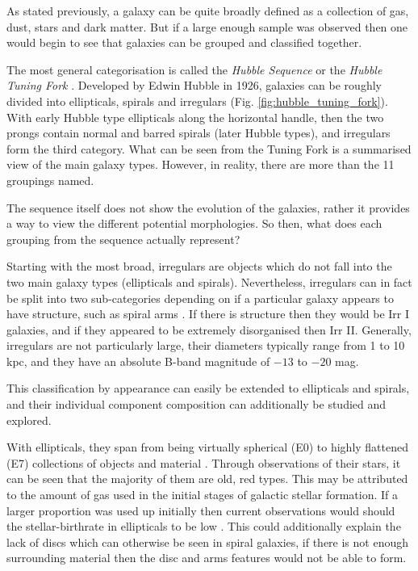 \documentclass[12pt, twocolumn]{revtex4-1}    %
\begin{document}
As stated previously, a galaxy can be quite broadly defined as a collection of gas, dust, stars and dark matter. But if a large enough sample was observed then one would begin to see that galaxies can be grouped and classified together.

The most general categorisation is called the \textit{Hubble Sequence} or the \textit{Hubble Tuning Fork} \citep{carroll_astro}. Developed by Edwin Hubble in 1926, galaxies can be roughly divided into ellipticals, spirals and irregulars (Fig. \ref{fig:hubble_tuning_fork}). With early Hubble type ellipticals along the horizontal handle, then the two prongs contain normal and barred spirals (later Hubble types), and irregulars form the third category. What can be seen from the Tuning Fork is a summarised view of the main galaxy types. However, in reality, there are more than the 11 groupings named.

The sequence itself does not show the evolution of the galaxies, rather it provides a way to view the different potential morphologies. So then, what does each grouping from the sequence actually represent? 

Starting with the most broad, irregulars are objects which do not fall into the two main galaxy types (ellipticals and spirals). Nevertheless, irregulars can in fact be split into two sub-categories depending on if a particular galaxy appears to have structure, such as spiral arms \citep{carroll_astro}. If there is structure then they would be Irr I galaxies, and if they appeared to be extremely disorganised then Irr II. Generally, irregulars are not particularly large, their diameters typically range from 1 to 10 kpc, and they have an absolute B-band magnitude of $-13$ to $-20$ mag.


This classification by appearance can easily be extended to ellipticals and spirals, and their individual component composition can additionally be studied and explored. 

With ellipticals, they span from being virtually spherical (E0) to highly flattened (E7) collections of objects and material \citep{moore_databook}. Through observations of their stars, it can be seen that the majority of them are old, red types. This may be attributed to the amount of gas used in the initial stages of galactic stellar formation. If a larger proportion was used up initially then current observations would should the stellar-birthrate in ellipticals to be low \citep{carroll_astro}. This could additionally explain the lack of discs which can otherwise be seen in spiral galaxies, if there is not enough surrounding material then the disc and arms features would not be able to form.
\end{document}
